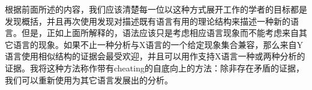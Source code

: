 根据前面所述的内容，我们应该清楚每一位以这种方式展开工作的学者的目标都是发现概括，并且再次使用发现对描述既有语言有用的理论结构来描述一种新的语言。但是，正如上面所解释的，语法应该只是考虑相应语言现象而不能考虑来自其它语言的现象。如果不止一种分析与X语言的一个给定现象集合兼容，那么来自Y语言使用相似结构的证据会最受欢迎，并且可以用作支持X语言一种或两种分析的证据。我将这种方法称作带有cheating的自底向上的方法：除非存在矛盾的证据，我们可以重新使用为其它语言发展出的分析。

